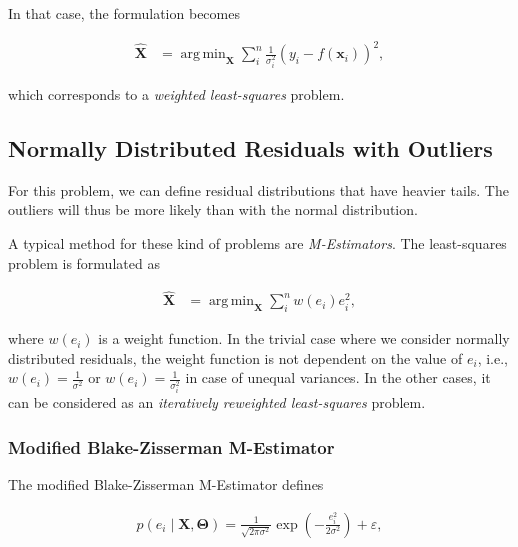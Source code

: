 \documentclass[12pt]{article}
\DeclareMathOperator*{\argmin}{arg\,min}
\begin{document}
      In that case, the formulation becomes

      \begin{equation}\label{eqn:model1dminllnorm2}
        \begin{aligned}
        \mathbf{\hat{X}} &=
          \argmin_{\mathbf{X}}\sum_i^n \frac{1}{\sigma_i^2}
          (y_i-f(\mathbf{x}_i))^2,
        \end{aligned}
      \end{equation}

      \noindent which corresponds to a \emph{weighted least-squares} problem.

    \subsection{Normally Distributed Residuals with Outliers}

      For this problem, we can define residual distributions that have heavier
      tails. The outliers will thus be more likely than with the normal
      distribution.

      A typical method for these kind of problems are \emph{M-Estimators}. The
      least-squares problem is formulated as

      \begin{equation}\label{eqn:model1dMEstimator}
        \begin{aligned}
        \mathbf{\hat{X}} &=
          \argmin_{\mathbf{X}}\sum_i^n w(e_i)e_i^2,
        \end{aligned}
      \end{equation}

      \noindent where $w(e_i)$ is a weight function. In the trivial case where
      we consider normally distributed residuals, the weight function is
      not dependent on the value of $e_i$, i.e., $w(e_i)=\frac{1}{\sigma^2}$ or
      $w(e_i)=\frac{1}{\sigma_i^2}$ in case of unequal variances. In the other
      cases, it can be considered as an
      \emph{iteratively reweighted least-squares} problem.

      \subsubsection{Modified Blake-Zisserman M-Estimator}

        The modified Blake-Zisserman M-Estimator defines

        \begin{equation}\label{eqn:model1dnormresidualspdfbz}
          \begin{aligned}
          p(e_i\mid\mathbf{X},\boldsymbol{\Theta}) =
            \frac{1}{\sqrt{2\pi\sigma^2}}
            \exp(-\frac{e_i^2}{2\sigma^2}) + \varepsilon,
          \end{aligned}
        \end{equation}
\end{document}
